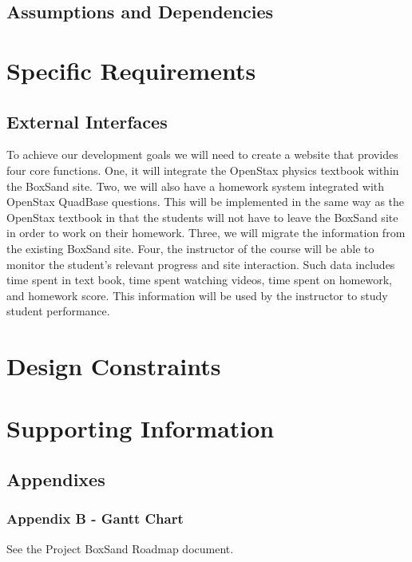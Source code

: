 \documentclass[onecolumn, draftclsnofoot,10pt, compsoc]{IEEEtran}
\begin{document}
\subsection{Assumptions and Dependencies}

\section{Specific Requirements}

\subsection{External Interfaces}

To achieve our development goals we will need to create a website that provides four core functions. One, it will integrate the OpenStax physics textbook within the BoxSand site. Two, we will also have a homework system integrated with OpenStax QuadBase questions. This will be implemented in the same way as the OpenStax textbook in that the students will not have to leave the BoxSand site in order to work on their homework. Three, we will migrate the information from the existing BoxSand site. Four, the instructor of the course will be able to monitor the student's relevant progress and site interaction. Such data includes time spent in text book, time spent watching videos, time spent on homework, and homework score. This information will be used by the instructor to study student performance.


\section{Design Constraints}


\section{Supporting Information}

\subsection{Appendixes}

\subsubsection{Appendix B - Gantt Chart}
See the Project BoxSand Roadmap document.
\end{document}
